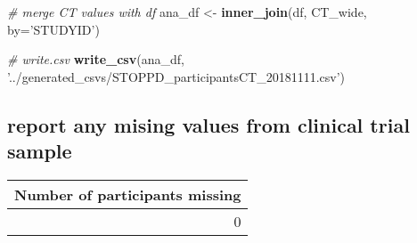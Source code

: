 \documentclass[]{article}
\newenvironment{Shaded}{\begin{snugshade}}{\end{snugshade}}
\newcommand{\KeywordTok}[1]{\textcolor[rgb]{0.13,0.29,0.53}{\textbf{#1}}}
\newcommand{\DataTypeTok}[1]{\textcolor[rgb]{0.13,0.29,0.53}{#1}}
\newcommand{\DecValTok}[1]{\textcolor[rgb]{0.00,0.00,0.81}{#1}}
\newcommand{\StringTok}[1]{\textcolor[rgb]{0.31,0.60,0.02}{#1}}
\newcommand{\CommentTok}[1]{\textcolor[rgb]{0.56,0.35,0.01}{\textit{#1}}}
\newcommand{\OperatorTok}[1]{\textcolor[rgb]{0.81,0.36,0.00}{\textbf{#1}}}
\newcommand{\NormalTok}[1]{#1}
\theoremstyle{definition}
\theoremstyle{definition}
\theoremstyle{definition}
\theoremstyle{remark}
\begin{document}
\begin{Shaded}
\begin{Highlighting}[]
\CommentTok{# merge CT values with df}
\NormalTok{ana_df <-}\StringTok{ }\KeywordTok{inner_join}\NormalTok{(df, CT_wide, }\DataTypeTok{by=}\StringTok{'STUDYID'}\NormalTok{)}

\CommentTok{# write.csv}
\KeywordTok{write_csv}\NormalTok{(ana_df, }\StringTok{'../generated_csvs/STOPPD_participantsCT_20181111.csv'}\NormalTok{)}
\end{Highlighting}
\end{Shaded}

\subsection{report any mising values from clinical trial
sample}\label{report-any-mising-values-from-clinical-trial-sample}

\begin{Shaded}
\end{Shaded}

\begin{tabular}{r}
\hline
Number of participants missing\\
\hline
0\\
\hline
\end{tabular}

\begin{Shaded}
\end{Shaded}
\end{document}
